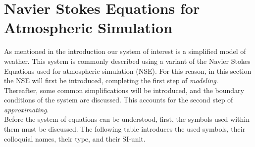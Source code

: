 \chapter{Navier Stokes Equations for Atmospheric Simulation}\label{chapter:navier_stokes}
As mentioned in the introduction our system of interest is a simplified model of weather.
This system is commonly described using a variant of the Navier Stokes Equations used for atmospheric simulation (NSE).
For this reason, in this section the NSE will first be introduced, completing the first step of \emph{modeling}.
Thereafter, some common simplifications will be introduced, and the boundary conditions of the system are discussed.
This accounts for the second step of \emph{approximating}.\\

Before the system of equations can be understood, first, the symbols used within them must be discussed.
The following table introduces the used symbols, their colloquial names, their type, and their SI-unit.

